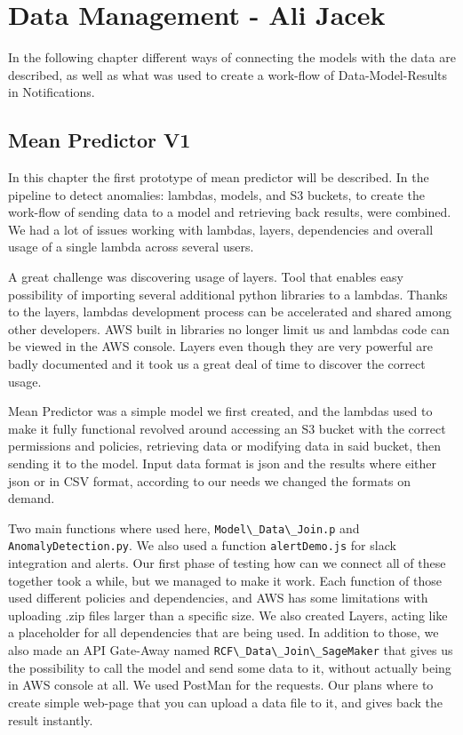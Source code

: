 \section{Data Management - Ali Jacek}

In the following chapter different ways of connecting the models with the data are described,  as well as what was used to create a work-flow of Data-Model-Results in Notifications.\\

 \subsection{Mean Predictor V1}
 
In this chapter the first prototype of mean predictor will be described. In the pipeline to detect anomalies: lambdas, models, and S3 buckets, to create the work-flow of sending data to a model and retrieving back results, were combined. We had a lot of issues working with lambdas, layers, dependencies and overall usage of a single lambda across several users. 

A great challenge was discovering usage of layers. Tool that enables easy possibility of importing several additional python libraries to a lambdas. Thanks to the layers, lambdas development process can be accelerated and shared among other developers. AWS built in libraries no longer limit us and lambdas code can be viewed in the AWS console.  Layers even though they are very powerful are badly documented and it took us a great deal of time to discover the correct usage. 

Mean Predictor was a simple model we first created, and the lambdas used to make it fully functional revolved around accessing an S3 bucket with the correct permissions and policies, retrieving data or modifying data in said bucket, then sending it to the model. Input data format is json and the results where either json or in CSV format, according to our needs we changed the formats on demand. 

Two main functions where used here, \verb|Model\_Data\_Join.p| and \verb|AnomalyDetection.py|. We also used a function \verb|alertDemo.js| for slack integration and alerts. Our first phase of testing how can we connect all of these together took a while, but we managed to make it work. Each function of those used different policies and dependencies, and AWS has some limitations with uploading .zip files larger than a specific size. We also created Layers, acting like a placeholder for all dependencies that are being used. In addition to those, we also made an API Gate-Away named \verb|RCF\_Data\_Join\_SageMaker| that gives us the possibility to call the model and send some data to it, without actually being in AWS console at all. We used PostMan for the requests. Our plans where to create simple web-page that you can upload a data file to it, and gives back the result instantly.

